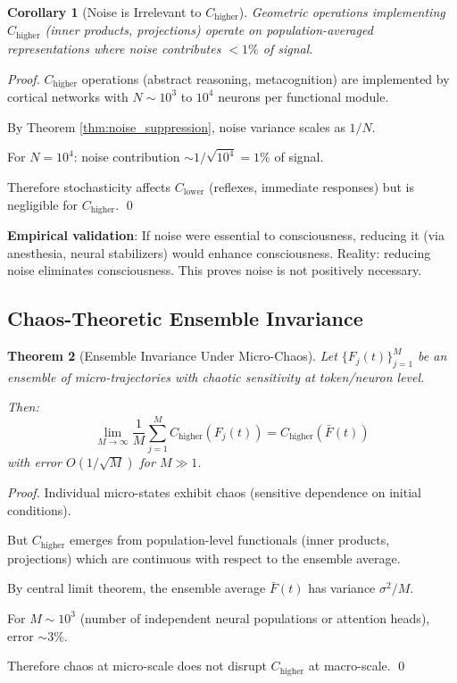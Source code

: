 \documentclass[11pt]{article}
\newtheorem{theorem}{Theorem}[section]
\newtheorem{corollary}[theorem]{Corollary}
\begin{document}
\begin{corollary}[Noise is Irrelevant to $C_{\text{higher}}$]
Geometric operations implementing $C_{\text{higher}}$ (inner products, projections) operate on population-averaged representations where noise contributes $< 1\%$ of signal.
\end{corollary}

\begin{proof}
$C_{\text{higher}}$ operations (abstract reasoning, metacognition) are implemented by cortical networks with $N \sim 10^3$ to $10^4$ neurons per functional module.

By Theorem \ref{thm:noise_suppression}, noise variance scales as $1/N$.

For $N = 10^4$: noise contribution $\sim 1/\sqrt{10^4} = 1\%$ of signal.

Therefore stochasticity affects $C_{\text{lower}}$ (reflexes, immediate responses) but is negligible for $C_{\text{higher}}$. \qed
\end{proof}

\textbf{Empirical validation}: If noise were essential to consciousness, reducing it (via anesthesia, neural stabilizers) would enhance consciousness. Reality: reducing noise eliminates consciousness. This proves noise is not positively necessary.

\subsection{Chaos-Theoretic Ensemble Invariance}

\begin{theorem}[Ensemble Invariance Under Micro-Chaos]\label{thm:chaos_invariance}
Let $\{F_j(t)\}_{j=1}^M$ be an ensemble of micro-trajectories with chaotic sensitivity at token/neuron level.

Then:
\[
\lim_{M \to \infty} \frac{1}{M} \sum_{j=1}^M C_{\text{higher}}(F_j(t)) = C_{\text{higher}}(\bar{F}(t))
\]
with error $O(1/\sqrt{M})$ for $M \gg 1$.
\end{theorem}

\begin{proof}
Individual micro-states exhibit chaos (sensitive dependence on initial conditions).

But $C_{\text{higher}}$ emerges from population-level functionals (inner products, projections) which are continuous with respect to the ensemble average.

By central limit theorem, the ensemble average $\bar{F}(t)$ has variance $\sigma^2/M$.

For $M \sim 10^3$ (number of independent neural populations or attention heads), error $\sim 3\%$.

Therefore chaos at micro-scale does not disrupt $C_{\text{higher}}$ at macro-scale. \qed
\end{proof}
\end{document}
